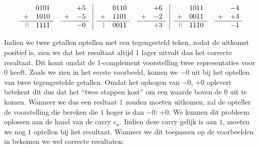 \begin{equation}
\begin{array}{rl|rl|rl}
\begin{array}{rr}
&0101\\
+&1010\\\hline
\textcolor{gray}{0}&1111
\end{array}
&
\begin{array}{rr}
&+5\\
+&-5\\\hline
&-0
\end{array}
&
\begin{array}{rr}
&0110\\
+&1101\\\hline
\textcolor{gray}{1}&0011
\end{array}
&
\begin{array}{rr}
&+6\\
+&-2\\\hline
&+3
\end{array}
&
\begin{array}{rr}
&1011\\
+&0011\\\hline
\textcolor{gray}{0}&1110
\end{array}
&
\begin{array}{rr}
&-4\\
+&+3\\\hline
&-1
\end{array}
\end{array}
\eqnlab{oneComplementFaultExample}
\end{equation}

Indien we twee getallen optellen met een tegengesteld teken, zodat de uitkomst positief is, zien we dat het resultaat altijd $1$ lager uitvalt dan het correcte resultaat. Dit komt omdat de $1$-complement voorstelling twee representaties voor $0$ heeft. Zoals we zien in het eerste voorbeeld, komen we $-0$ uit bij het optellen van twee tegengestelde getallen. Omdat het ophogen van $-0$, $+0$ oplevert betekent dit dus dat het ``twee stappen kost'' om een waarde boven de $0$ uit te komen. Wanneer we dus een resltaat $1$ zouden moeten uitkomen, zal de opteller de voorstelling die bereken die $1$ hoger is dan $-0$: $+0$. We kunnen dit probleem oplossen aan de hand van de carry $c_n$. Indien deze carry gelijk is aan $1$, moeten we nog $1$ optellen bij het resultaat. Wanneer we dit toepassen op de voorbeelden in  bekomen we wel correcte resultaten:


